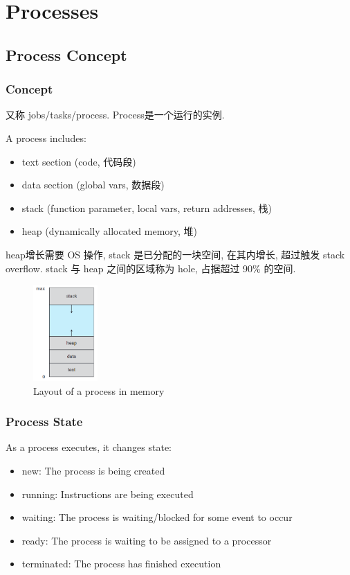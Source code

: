 \newpage
\section{Processes}
\subsection{Process Concept}
\subsubsection{Concept}
又称 jobs/tasks/process. Process是一个运行的实例. 

A process includes:
\begin{itemize}
    \item text section (code, 代码段)
    \item data section (global vars, 数据段)
    \item stack (function parameter, local vars, return addresses, 栈)
    \item heap (dynamically allocated memory, 堆)
\end{itemize}

heap增长需要 OS 操作, stack 是已分配的一块空间, 在其内增长, 超过触发 stack overflow. stack 与 heap 之间的区域称为 hole, 占据超过 90\% 的空间. 

\begin{figure}[!htb]
    \centering
    \includegraphics[width=0.22\textwidth]{pic/OS3/Layout of a process in memory.png}
    \caption{Layout of a process in memory}
\end{figure}

\subsubsection{Process State}
As a process executes, it changes state:
\begin{itemize}\small
    \item new: The process is being created
    \item running: Instructions are being executed
    \item waiting: The process is waiting/blocked for some event to occur
    \item ready: The process is waiting to be assigned to a processor
    \item terminated: The process has finished execution
\end{itemize}

